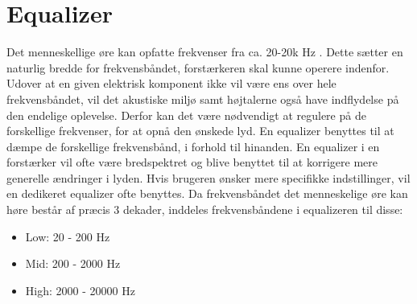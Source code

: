 \section{Equalizer}
\label{equalizer}
Det menneskellige øre kan opfatte frekvenser fra ca. 20-20k Hz \cite{hertz}. Dette sætter en naturlig bredde for frekvensbåndet, forstærkeren skal kunne operere indenfor. Udover at en given elektrisk komponent ikke vil være ens over hele frekvensbåndet, vil det akustiske miljø samt højtalerne også have indflydelse på den endelige oplevelse.  Derfor kan det være nødvendigt at regulere på de forskellige frekvenser, for at opnå den ønskede lyd. En equalizer benyttes til at dæmpe de forskellige frekvensbånd, i forhold til hinanden. En equalizer i en forstærker vil ofte være bredspektret og blive benyttet til at korrigere mere generelle ændringer i lyden. Hvis brugeren ønsker mere specifikke indstillinger, vil en dedikeret equalizer ofte benyttes. Da frekvensbåndet det menneskelige øre kan høre består af præcis 3 dekader, inddeles frekvensbåndene i equalizeren til disse:

\begin{itemize}
\item Low: 20 - 200 Hz
\item Mid: 200 - 2000 Hz
\item High: 2000 - 20000 Hz
\end{itemize}

